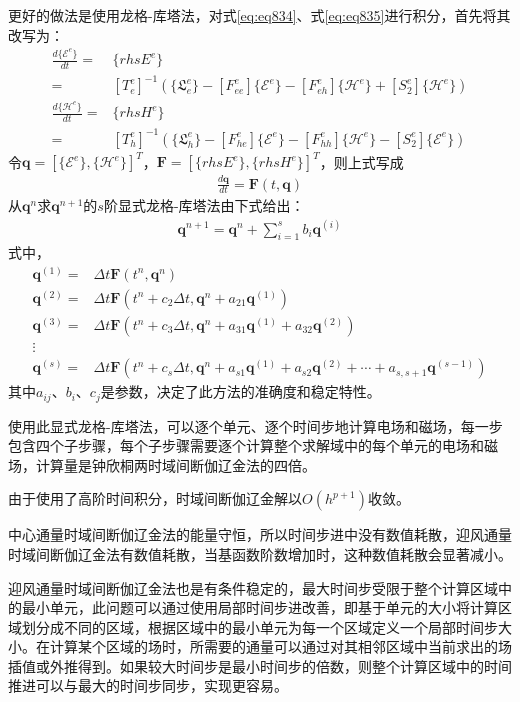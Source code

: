 \documentclass{article}
\numberwithin{equation}{section}
\renewcommand{\vec}[1]{\boldsymbol{#1}}
\begin{document}
更好的做法是使用龙格-库塔法，对式\ref{eq:eq834}、式\ref{eq:eq835}进行积分，首先将其改写为：
\begin{align}
    \label{eq:eq843}
    \frac{d\{\mathcal{E}^e\}}{dt}=&\{rhsE^e\} \nonumber \\
                                 =&[T_e^e]^{-1}(\{\mathfrak{L}_e^e\}-[F^e_{ee}]\{\mathcal{E}^e\}-[F^e_{eh}]\{\mathcal{H}^e\}+[S_2^e]\{\mathcal{H}^e\}) \\
    \label{eq:eq844}
    \frac{d\{\mathcal{H}^e\}}{dt}=&\{rhsH^e\} \nonumber \\
                                 =&[T_h^e]^{-1}(\{\mathfrak{L}_h^e\}-[F^e_{he}]\{\mathcal{E}^e\}-[F^e_{hh}]\{\mathcal{H}^e\}-[S_2^e]\{\mathcal{E}^e\})
\end{align}
令$\vec{q}=[\{\mathcal{E}^e\},\{\mathcal{H}^e\}]^T$，$\vec{F}=[\{rhsE^e\},\{rhsH^e\}]^T$，则上式写成
\begin{align}
    \label{eq:eq845}
    \frac{d\vec{q}}{dt}=\vec{F}(t,\vec{q})
\end{align}
从$\vec{q}^n$求$\vec{q}^{n+1}$的$s$阶显式龙格-库塔法由下式给出：
\begin{align}
    \label{eq:eq846}
    \vec{q}^{n+1}=\vec{q}^{n}+\sum_{i=1}^{s}b_i\vec{q}^{(i)}
\end{align}
式中，
\begin{align}
    \vec{q}^{(1)}=&\Delta t\vec{F}(t^n,\vec{q}^n) \nonumber \\
    \vec{q}^{(2)}=&\Delta t\vec{F}(t^n+c_2\Delta t,\vec{q}^n+a_{21}\vec{q}^{(1)}) \nonumber \\
    \vec{q}^{(3)}=&\Delta t\vec{F}(t^n+c_3\Delta t,\vec{q}^n+a_{31}\vec{q}^{(1)}+a_{32}\vec{q}^{(2)}) \nonumber \\
    \vdots \nonumber \\
    \vec{q}^{(s)}=&\Delta t\vec{F}(t^n+c_s\Delta t,\vec{q}^n+a_{s1}\vec{q}^{(1)}+a_{s2}\vec{q}^{(2)}+\cdots+a_{s,s+1}\vec{q}^{(s-1)}) \nonumber
\end{align}
其中$a_{ij}$、$b_{i}$、$c_{j}$是参数，决定了此方法的准确度和稳定特性。\par
使用此显式龙格-库塔法，可以逐个单元、逐个时间步地计算电场和磁场，每一步包含四个子步骤，每个子步骤需要逐个计算整个求解域中的每个单元的电场和磁场，计算量是钟欣桐两时域间断伽辽金法的四倍。\par
由于使用了高阶时间积分，时域间断伽辽金解以$O(h^{p+1})$收敛。\par
中心通量时域间断伽辽金法的能量守恒，所以时间步进中没有数值耗散，迎风通量时域间断伽辽金法有数值耗散，当基函数阶数增加时，这种数值耗散会显著减小。\par
迎风通量时域间断伽辽金法也是有条件稳定的，最大时间步受限于整个计算区域中的最小单元，此问题可以通过使用局部时间步进改善，即基于单元的大小将计算区域划分成不同的区域，根据区域中的最小单元为每一个区域定义一个局部时间步大小。在计算某个区域的场时，所需要的通量可以通过对其相邻区域中当前求出的场插值或外推得到。如果较大时间步是最小时间步的倍数，则整个计算区域中的时间推进可以与最大的时间步同步，实现更容易。
\end{document}
